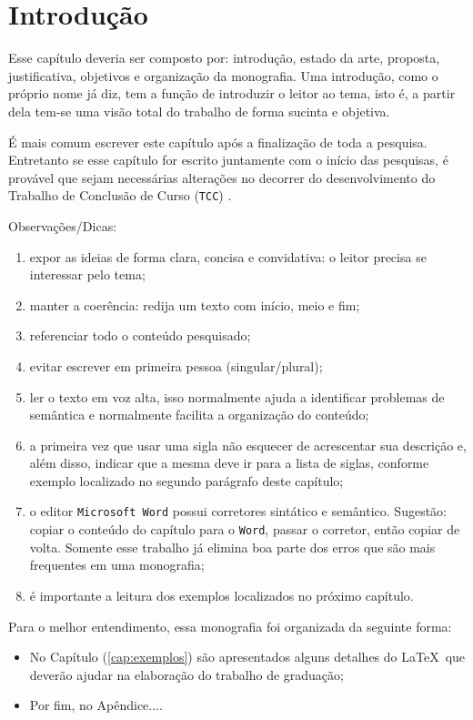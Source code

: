 \chapter{Introdução} 
\label{cap:introducao}


Esse capítulo deveria ser composto por: introdução, estado da arte, proposta,  justificativa, objetivos e organização da monografia. Uma introdução, como o próprio nome já diz, tem a função de introduzir o leitor ao tema, isto é, a partir dela tem-se uma visão total do trabalho de forma sucinta e objetiva.

É mais comum escrever este capítulo após a finalização de toda a pesquisa. Entretanto se esse
capítulo for escrito juntamente com o início das pesquisas, é provável que sejam necessárias alterações no decorrer do desenvolvimento do Trabalho de Conclusão de Curso (\verb'TCC') \label{exemplo:nomenclatura}.

Observações/Dicas:
\begin{enumerate}
\item expor as ideias de forma clara, concisa e convidativa: o leitor precisa se interessar pelo tema;
\item manter a coerência: redija um texto com início, meio e fim;

\item referenciar todo o conteúdo pesquisado;

\item evitar escrever em primeira pessoa (singular/plural);

\item ler o texto em voz alta, isso normalmente ajuda a identificar  problemas de semântica e normalmente facilita a organização do conteúdo;

\item a primeira vez que usar uma sigla não esquecer de acrescentar sua descrição e, além disso, indicar que a mesma deve ir para a lista de siglas, conforme exemplo localizado no segundo parágrafo deste capítulo;

\item o editor \verb'Microsoft Word' possui corretores sintático e semântico. Sugestão: copiar o conteúdo do capítulo para o \verb'Word', passar o corretor, então copiar de volta. Somente esse trabalho já elimina boa parte dos erros que são mais frequentes em uma monografia;

\item é importante a leitura dos exemplos localizados no próximo capítulo.

\end{enumerate}


Para o melhor entendimento, essa monografia foi organizada da seguinte forma:

\begin{itemize}
\item No Capítulo (\ref{cap:exemplos}) são apresentados alguns detalhes do \LaTeX\ que deverão ajudar na elaboração do trabalho de graduação;

\item Por fim, no Apêndice....
\end{itemize}


